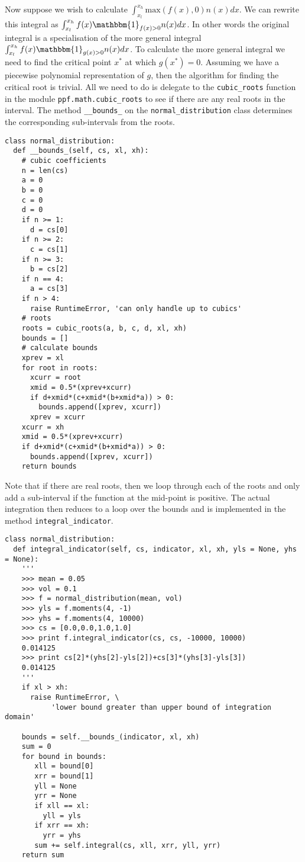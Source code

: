 Now suppose we wish to calculate $\int_{x_l}^{x_h} \mbox{max}(f(x), 0) n(x) dx$. 
We can rewrite this integral as $\int_{x_l}^{x_h} f(x) \mathbbm{1}_{f(x) > 0}  n(x) dx$. 
In other words the original integral is a specialisation of the more general integral 
$\int_{x_l}^{x_h} f(x) \mathbbm{1}_{g(x) > 0}  n(x) dx$. To calculate the
more general integral we need to find the critical point $x^*$ at which
$g(x^*)=0$. Assuming we have a piecewise polynomial representation of
$g$, then the algorithm for finding the critical root is trivial. All we
need to do is delegate to the \verb|cubic_roots| function in the module
\verb|ppf.math.cubic_roots| to see if there are any real roots in the
interval. The method \verb|__bounds_| on the \verb|normal_distribution| class 
determines the corresponding sub-intervals from the roots.
\begin{verbatim}
class normal_distribution:
  def __bounds_(self, cs, xl, xh):
    # cubic coefficients
    n = len(cs)
    a = 0
    b = 0
    c = 0
    d = 0
    if n >= 1:
      d = cs[0]
    if n >= 2:
      c = cs[1]
    if n >= 3:
      b = cs[2]
    if n == 4:
      a = cs[3]
    if n > 4:
      raise RuntimeError, 'can only handle up to cubics'
    # roots
    roots = cubic_roots(a, b, c, d, xl, xh)
    bounds = []
    # calculate bounds
    xprev = xl
    for root in roots:
      xcurr = root
      xmid = 0.5*(xprev+xcurr)
      if d+xmid*(c+xmid*(b+xmid*a)) > 0:
        bounds.append([xprev, xcurr])
      xprev = xcurr
    xcurr = xh      
    xmid = 0.5*(xprev+xcurr)
    if d+xmid*(c+xmid*(b+xmid*a)) > 0:
      bounds.append([xprev, xcurr])
    return bounds
\end{verbatim}
Note that if there are real roots, then we loop through each of the
roots and only add a sub-interval if the function at the mid-point is positive. 
The actual integration then reduces to a loop over the bounds and is implemented in 
the method \verb|integral_indicator|.
\begin{verbatim}
class normal_distribution:
  def integral_indicator(self, cs, indicator, xl, xh, yls = None, yhs = None):
    '''
    >>> mean = 0.05
    >>> vol = 0.1
    >>> f = normal_distribution(mean, vol)
    >>> yls = f.moments(4, -1)
    >>> yhs = f.moments(4, 10000)
    >>> cs = [0.0,0.0,1.0,1.0]
    >>> print f.integral_indicator(cs, cs, -10000, 10000)
    0.014125
    >>> print cs[2]*(yhs[2]-yls[2])+cs[3]*(yhs[3]-yls[3])
    0.014125
    '''
    if xl > xh:
      raise RuntimeError, \
           'lower bound greater than upper bound of integration domain'
        
    bounds = self.__bounds_(indicator, xl, xh)
    sum = 0
    for bound in bounds:
       xll = bound[0]
       xrr = bound[1]
       yll = None
       yrr = None
       if xll == xl:
         yll = yls
       if xrr == xh:
         yrr = yhs
       sum += self.integral(cs, xll, xrr, yll, yrr)
    return sum
\end{verbatim}
